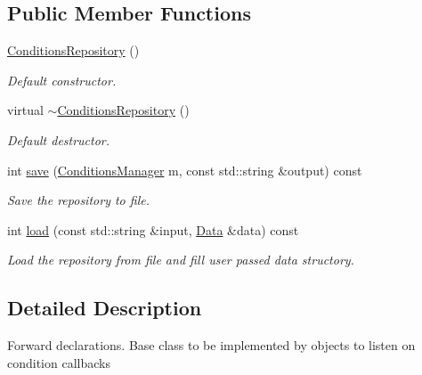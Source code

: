\subsection*{Public Member Functions}
\begin{DoxyCompactItemize}
\item 
\hyperlink{class_d_d4hep_1_1_conditions_1_1_conditions_repository_aaf9d3a63aa6f596610104cbc1af2897a}{ConditionsRepository} ()
\begin{DoxyCompactList}\small\item\em Default constructor. \item\end{DoxyCompactList}\item 
virtual \hyperlink{class_d_d4hep_1_1_conditions_1_1_conditions_repository_a0c539a83a34e2a2fb3d0bab9586ec3e6}{$\sim$ConditionsRepository} ()
\begin{DoxyCompactList}\small\item\em Default destructor. \item\end{DoxyCompactList}\item 
int \hyperlink{class_d_d4hep_1_1_conditions_1_1_conditions_repository_aa51070661c9e9d9bbb17bc83924ffbec}{save} (\hyperlink{class_d_d4hep_1_1_conditions_1_1_conditions_manager}{ConditionsManager} m, const std::string \&output) const 
\begin{DoxyCompactList}\small\item\em Save the repository to file. \item\end{DoxyCompactList}\item 
int \hyperlink{class_d_d4hep_1_1_conditions_1_1_conditions_repository_a66b77941fef3864614704a6b82b2d457}{load} (const std::string \&input, \hyperlink{class_d_d4hep_1_1_conditions_1_1_conditions_repository_a2a262d14363e0c6879677397dc595012}{Data} \&data) const 
\begin{DoxyCompactList}\small\item\em Load the repository from file and fill user passed data structory. \item\end{DoxyCompactList}\end{DoxyCompactItemize}


\subsection{Detailed Description}
Forward declarations. Base class to be implemented by objects to listen on condition callbacks

